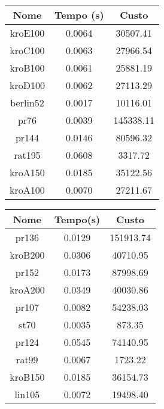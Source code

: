 \documentclass{article}
\begin{document}
\begin{multicols}{2}
    \begin{tabular}{c c c}
        Nome & Tempo (s) & Custo \\
        \hline
        kroE100 & 0.0064 & 30507.41 \\
        kroC100 & 0.0063 & 27966.54 \\
        kroB100 & 0.0061 & 25881.19 \\
        kroD100 & 0.0062 & 27113.29 \\
        berlin52 & 0.0017 & 10116.01 \\
        pr76 & 0.0039 & 145338.11 \\
        pr144 & 0.0146 & 80596.32 \\
        rat195 & 0.0608 & 3317.72 \\
        kroA150 & 0.0185 & 35122.56 \\
        kroA100 & 0.0070 & 27211.67 \\
        \hline
    \end{tabular}
    \begin{tabular}{c c c}
        Nome & Tempo(s) & Custo \\
        \hline
        pr136 & 0.0129 & 151913.74 \\
        kroB200 & 0.0306 & 40710.95 \\
        pr152 & 0.0173 & 87998.69 \\
        kroA200 & 0.0349 & 40030.86 \\
        pr107 & 0.0082 & 54238.03 \\
        st70 & 0.0035 & 873.35 \\
        pr124 & 0.0545 & 74140.95 \\
        rat99 & 0.0067 & 1723.22 \\
        kroB150 & 0.0185 & 36154.73 \\
        lin105 & 0.0072 & 19498.40 \\
        \hline
    \end{tabular}
\end{multicols}
\end{document}
